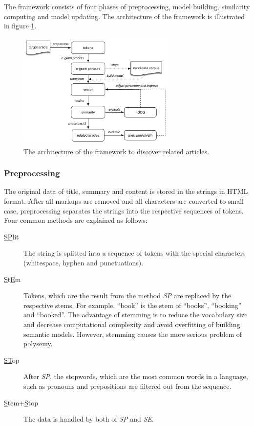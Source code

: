 The framework consists of four phases of preprocessing, model building, similarity computing and model updating. The architecture of the framework is illustrated in figure \ref{fig:unsupervised}. 

\begin{figure}[!htb]
    \centering
    \includegraphics[width=0.7\textwidth]{fig/unsupervise}
    \caption{The architecture of the framework to discover related articles.}
    \label{fig:unsupervised}
\end{figure}


\subsubsection{Preprocessing}
The original data of title, summary and content is stored in the strings in HTML format. After all markups are removed and all characters are converted to small case, preprocessing separates the strings into the respective sequences of tokens. Four common methods are explained as follows:

\begin{description}
\item[\underline{SP}lit] The string is splitted into a sequence of tokens with the special characters (whitespace, hyphen and punctuations). 
\item[\underline{S}t\underline{E}m] Tokens, which are the result from the method \textit{SP} are replaced by the respective stems. For example, ``book'' is the stem of ``books'', ``booking'' and ``booked''. The advantage of stemming is to reduce the vocabulary size and decrease computational complexity and avoid overfitting of building semantic models. However, stemming causes the more serious problem of polysemy. 
\item[\underline{ST}op] After \textit{SP}, the stopwords, which are the most common words in a language, such as pronouns and prepositions are filtered out from the sequence. 
\item[\underline{S}tem+\underline{S}top] The data is handled by both of \textit{SP} and \textit{SE}. 
\end{description}

